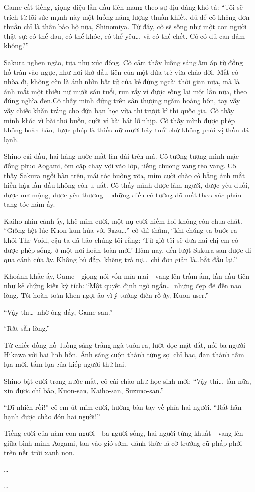 \documentclass[../main.tex]{subfiles}
\begin{document}
Game cất tiếng, giọng điệu lần đầu tiên mang theo sự dịu dàng khó tả: ``Tôi sẽ trích từ lõi sức mạnh này một luồng năng lượng thuần khiết, đủ để cô không đơn thuần chỉ là thần bảo hộ nữa, Shinomiya. Từ đây, cô sẽ sống như một con người thật sự: có thể đau, có thể khóc, có thể yêu\dots\ và có thể chết. Cô có đủ can đảm không?''

Sakura nghẹn ngào, tựa như xúc động. Cô cảm thấy luồng sáng ấm áp từ đồng hồ tràn vào ngực, như hơi thở đầu tiên của một đứa trẻ vừa chào đời. Mắt cô nhòa đi, không còn là ánh nhìn bất tử của kẻ đứng ngoài thời gian nữa, mà là ánh mắt một thiếu nữ mười sáu tuổi, run rẩy vì được sống lại một lần nữa, theo đúng nghĩa đen.Cô thấy mình đứng trên sân thượng ngắm hoàng hôn, tay vẫy vẫy chiếc khăn trắng cho đứa bạn học vừa thi trượt kì thi quốc gia. Cô thấy mình khóc vì bài thơ buồn, cười vì bài hát lỡ nhịp. Cô thấy mình được phép không hoàn hảo, được phép là thiếu nữ mười bảy tuổi chứ không phải vị thần đá lạnh.

Shino cúi đầu, hai hàng nước mắt lăn dài trên má. Cô tưởng tượng mình mặc đồng phục Aogami, ôm cặp chạy vội vào lớp, tiếng chuông vàng réo vang. Cô thấy Sakura ngồi bàn trên, mái tóc buông xõa, mỉm cười chào cô bằng ánh mắt hiền hậu lần đầu không còn u uất. Cô thấy mình được làm người, được yếu đuối, được mơ mộng, được yêu thương\dots\ những điều cô tưởng đã mất theo xác pháo tang tóc năm ấy.

Kaiho nhìn cảnh ấy, khẽ mỉm cười, một nụ cười hiếm hoi không còn chua chát. ``Giống hệt lúc Kuon-kun hứa với Suzu\dots'' cô thì thầm, ``khi chúng ta bước ra khỏi The Void, cậu ta đã bảo chúng tôi rằng: `Từ giờ tôi sẽ đưa hai chị em cô được phép sống, ở một nơi hoàn toàn mới.' Hôm nay, đến lượt Sakura-san được đi qua cánh cửa ấy. Không bù đắp, không trả nợ\dots\ chỉ đơn giản là\dots bắt đầu lại.''

Khoảnh khắc ấy, Game - giọng nói vốn mỉa mai - vang lên trầm ấm, lần đầu tiên như kẻ chứng kiến kỳ tích: ``Một quyết định ngớ ngẩn\dots\ nhưng đẹp đẽ đến nao lòng. Tôi hoàn toàn khen ngợi ảo vì ý tưởng điên rồ ấy, Kuon-user.''

``Vậy thì\dots\ nhờ ông đấy, Game-san.''

``Rất sẵn lòng.''

Từ chiếc đồng hồ, luồng sáng trắng ngà tuôn ra, lướt dọc mặt đất, nối ba người Hikawa với hai linh hồn. Ánh sáng cuộn thành từng sợi chỉ bạc, đan thành tấm lụa mới, tấm lụa của kiếp người thứ hai.

Shino bật cười trong nước mắt, cô cúi chào như học sinh mới: ``Vậy thì\dots\ lần nữa, xin được chỉ bảo, Kuon-san, Kaiho-san, Suzuno-san.''

``Dĩ nhiên rồi!'' cô em út mỉm cười, hướng bàn tay về phía hai người. ``Rất hân hạnh được chào đón hai người!''

Tiếng cười của năm con người - ba người sống, hai người từng khuất - vang lên giữa bình minh Aogami, tan vào gió sớm, đánh thức lá cờ trường cũ phấp phới trên nền trời xanh non.

\dots

\dots
\end{document}
